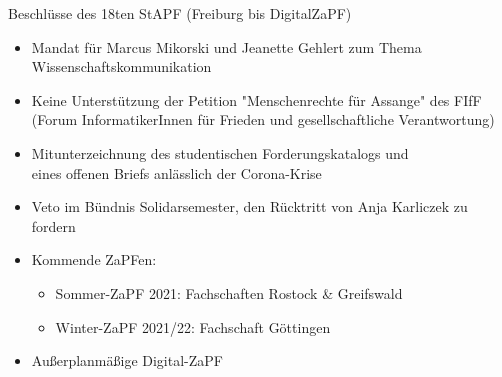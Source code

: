 \documentclass[compress, aspectratio=169]{beamer}
\begin{document}
\begin{frame}{Beschlüsse des 18ten StAPF (Freiburg bis DigitalZaPF)}
  \begin{itemize}
      \item Mandat für Marcus Mikorski und Jeanette Gehlert zum Thema Wissenschaftskommunikation
      \item Keine Unterstützung der Petition "Menschenrechte für Assange" des FIfF (Forum InformatikerInnen für Frieden und gesellschaftliche Verantwortung)
      \item Mitunterzeichnung des studentischen Forderungskatalogs und \\
      eines offenen Briefs anlässlich der Corona-Krise
      \item Veto im Bündnis Solidarsemester, den Rücktritt von Anja Karliczek zu fordern
      \item Kommende ZaPFen:
        \begin{itemize}
          \item Sommer-ZaPF 2021: Fachschaften Rostock \& Greifswald
          \item Winter-ZaPF 2021/22: Fachschaft Göttingen
        \end{itemize}
    \item Außerplanmäßige Digital-ZaPF
  \end{itemize}
\end{frame}

\end{document}
